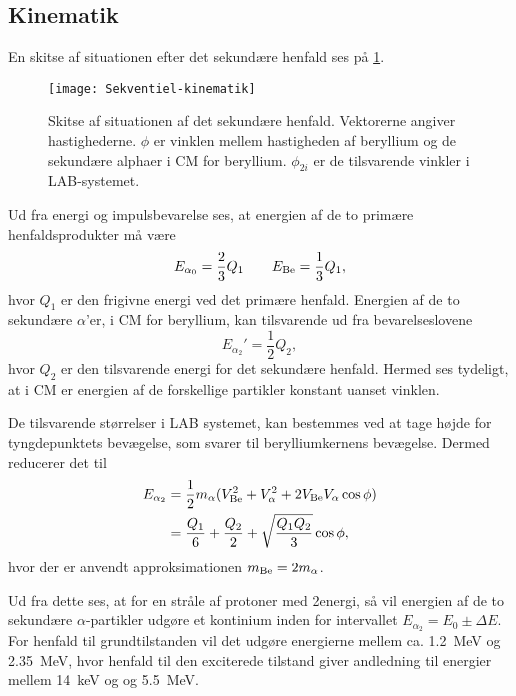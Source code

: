 \subsection{Kinematik}
\label{sec:sekv-kinematik}

En skitse af situationen efter det sekundære henfald ses på \cref{fig:secundary}.
\begin{figure}[h]
  \centering
  \texttt{[image: Sekventiel-kinematik]}
  \caption{Skitse af situationen af det sekundære henfald. Vektorerne angiver hastighederne. $\phi$ er
    vinklen mellem hastigheden af beryllium og de sekundære alphaer i CM for beryllium. $\phi_{2i}$ er
    de tilsvarende vinkler i LAB-systemet.}
  \label{fig:secundary}
\end{figure}

Ud fra energi og impulsbevarelse ses, at energien af de to primære henfaldsprodukter må være
\begin{equation}
  \label{eq:Ealpha0}
  E_{\alpha_{0}} = \frac{2}{3} Q_{1} \qquad E_{\ce{Be}} = \frac{1}{3} Q_{1},
\end{equation}
hvor $Q_{1}$ er den frigivne energi ved det primære henfald. Energien af de to sekundære $\alpha$'er, i CM
for beryllium, kan tilsvarende ud fra bevarelseslovene
\begin{equation}
  \label{eq:Ealpha2}
  E_{\alpha_{2}}' = \frac{1}{2} Q_{2},
\end{equation}
hvor $Q_{2}$ er den tilsvarende energi for det sekundære henfald. Hermed ses tydeligt, at i CM er
energien af de forskellige partikler konstant uanset vinklen.

De tilsvarende størrelser i LAB systemet, kan bestemmes ved at tage højde for tyngdepunktets
bevægelse, som svarer til berylliumkernens bevægelse. Dermed reducerer det til
\begin{align}
  E_{\alpha_{2}} %
           &= \frac{1}{2}m_{\alpha} (V_{\ce{Be}}^{2} + V_{\alpha}^{2} + 2V_{\ce{Be}}V_{\alpha} \cos \phi) \notag \\
           &= \frac{Q_{1}}{6} + \frac{Q_{2}}{2} + \sqrt{\frac{Q_{1}Q_{2}}{3}} \cos \phi,           
           \label{eq:E2LAB} 
\end{align}
hvor der er anvendt approksimationen $m_{\ce{Be}} = 2m_{\alpha}$.

Ud fra dette ses, at for en stråle af protoner med 2\MeV energi, så vil energien af de to sekundære
$\alpha$-partikler udgøre et kontinium inden for intervallet $E_{\alpha_{2}} = E_{0} \pm \Delta E$. For henfald til
grundtilstanden vil det udgøre energierne mellem ca. \SI{1.2}{\MeV} og \SI{2.35}{\MeV}, hvor henfald
til den exciterede tilstand giver andledning til energier mellem \SI{14}{\keV} og og \SI{5.5}{\MeV}.

